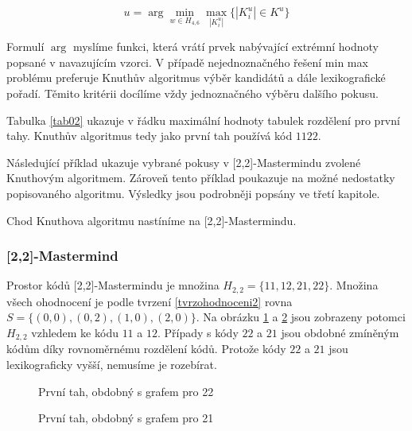 \[ u = \arg\min_{w \in H_{4,6}} \max_{|K^u_i|} \{ |K^u_i| \in K^u\} \]

Formulí $\arg$ myslíme funkci, která vrátí prvek nabývající extrémní hodnoty popsané v navazujícím vzorci. V případě nejednoznačného řešení min max problému preferuje Knuthův algoritmus výběr kandidátů a dále lexikografické pořadí. Těmito kritérii docílíme vždy jednoznačného výběru dalšího pokusu. 

\begin{prikl}\label{prminmaxprvnipokus}
    Tabulka \ref{tab02} ukazuje v řádku maximální hodnoty tabulek rozdělení pro první tahy. Knuthův algoritmus tedy jako první tah používá kód $1122$. 
\end{prikl}

Následující příklad ukazuje vybrané pokusy v [2,2]-Mastermindu zvolené Knuthovým algoritmem. Zároveň tento příklad poukazuje na možné nedostatky popisovaného algoritmu. Výsledky jsou podrobněji popsány ve třetí kapitole.

Chod Knuthova algoritmu nastíníme na [2,2]-Mastermindu. 
\subsubsection{[2,2]-Mastermind}
Prostor kódů [2,2]-Mastermindu je množina $H_{2,2} = \{11,12,21,22\}$. Množina všech ohodnocení je podle tvrzení \ref{tvrzohodnoceni2} rovna $S = \{(0,0), (0,2), (1,0), (2,0)\}$. Na obrázku \ref{fig22prvnitah11} a \ref{fig22prvnitah12} jsou zobrazeny potomci $H_{2,2}$ vzhledem ke kódu $11$ a $12$. Případy s kódy $22$ a $21$ jsou obdobné zmíněným kódům díky rovnoměrnému rozdělení kódů. Protože kódy $22$ a $21$ jsou lexikograficky vyšší, nemusíme je rozebírat. 
\begin{figure}[h!]
    \centering
    \caption{První tah, obdobný s grafem pro 22}
    \label{fig22prvnitah11}
    \end{figure}
\begin{figure}[h!]
    \centering
    \caption{První tah, obdobný s grafem pro 21}
    \label{fig22prvnitah12}
\end{figure}

